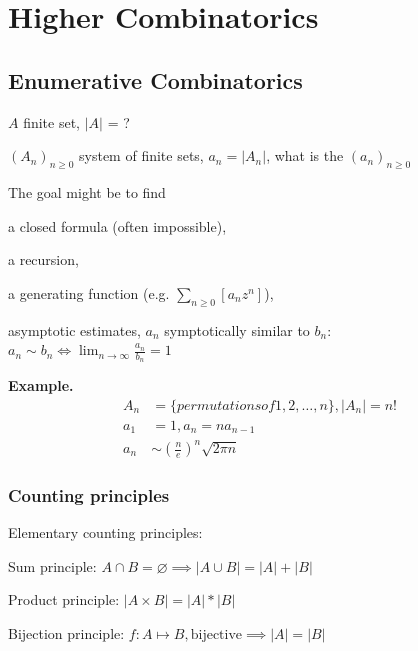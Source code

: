 

\chapter{Higher Combinatorics}

\section{Enumerative Combinatorics}

\strut{}
$A$ finite set, $|A|$ = ?

$(A_n)_{n ≥ 0}$ system of finite sets, $a_n = |A_n|$, what is the  $(a_n)_{n ≥ 0}$

The goal might be to find
\begin{compactitem}
  \item a closed formula (often impossible),
  \item a recursion,
  \item a generating function (e.g. $\sum_{n \geq 0}[a_n z^n]$),
  \item asymptotic estimates, $a_n$ symptotically similar to $b_n$:\\
    $a_n \sim b_n \iff \lim_{n \to \infty} \frac{a_n}{b_n} = 1$
\end{compactitem}


\textbf{Example.}
\begin{align*}
  A_n &= \{permutations of 1,2, \ldots, n\}, |A_n| = n! \\
  a_1 &= 1, a_n = n a_{n-1} \\
  a_n &\sim \left(\frac{n}{e} \right)^n \sqrt{2\pi n}
\end{align*}


\subsection{Counting principles}

Elementary counting principles:
\begin{compactenum}
\item Sum principle:
  $A\cap B = \varnothing \implies |A\cup B| = |A| + |B|$
\item Product principle:
  $|A\times B| = |A| * |B|$
\item Bijection principle:
  $f: A\mapsto B, \text{bijective}\implies |A| = |B|$
\end{compactenum}

